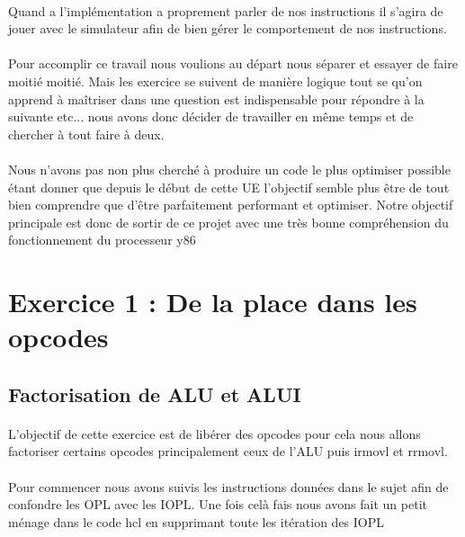 \documentclass[12pt]{article}
\begin{document}
\paragraph{} Quand a l’implémentation a proprement parler de nos instructions il
s’agira de jouer avec le simulateur afin de bien gérer le comportement de nos instructions.

\paragraph{} Pour accomplir ce travail nous voulions au départ nous séparer et essayer de faire moitié moitié. Mais les exercice se suivent de manière logique tout se qu'on apprend à maîtriser dans une question est indispensable pour répondre à la suivante etc... nous avons donc décider de travailler en même temps et de chercher à tout faire à deux.

\paragraph{}Nous n'avons pas non plus cherché à produire un code le plus optimiser possible étant donner que depuis le début de cette UE l'objectif semble plus être de tout bien comprendre que d’être parfaitement performant et optimiser. Notre objectif principale est donc de sortir de ce projet avec une très bonne compréhension du fonctionnement du processeur y86

\newpage


\section{Exercice 1 : De la place dans les opcodes}
\subsection{Factorisation de ALU et ALUI}

\paragraph{}L'objectif de cette exercice est de libérer des opcodes pour cela nous allons factoriser certains opcodes principalement ceux de l'ALU puis irmovl et rrmovl.

\paragraph{}Pour commencer nous avons suivis les instructions données dans le sujet afin de confondre les OPL avec les IOPL. Une fois celà fais nous avons fait un petit ménage
dans le code hcl en supprimant toute les itération des IOPL
\end{document}
